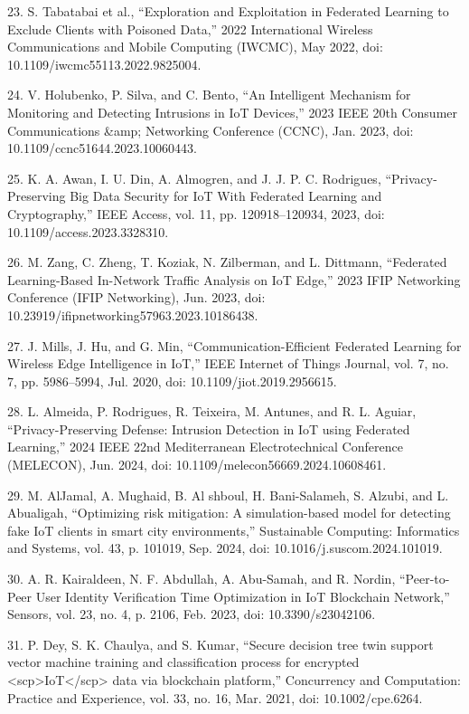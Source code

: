 23. S. Tabatabai et al., ``Exploration and Exploitation in Federated
Learning to Exclude Clients with Poisoned Data,'' 2022 International
Wireless Communications and Mobile Computing (IWCMC), May 2022, doi:
10.1109/iwcmc55113.2022.9825004.

24. V. Holubenko, P. Silva, and C. Bento, ``An Intelligent Mechanism for
Monitoring and Detecting Intrusions in IoT Devices,'' 2023 IEEE 20th
Consumer Communications \&amp; Networking Conference (CCNC), Jan. 2023,
doi: 10.1109/ccnc51644.2023.10060443.

25. K. A. Awan, I. U. Din, A. Almogren, and J. J. P. C. Rodrigues,
``Privacy-Preserving Big Data Security for IoT With Federated Learning
and Cryptography,'' IEEE Access, vol. 11, pp. 120918--120934, 2023, doi:
10.1109/access.2023.3328310.

26. M. Zang, C. Zheng, T. Koziak, N. Zilberman, and L. Dittmann,
``Federated Learning-Based In-Network Traffic Analysis on IoT Edge,''
2023 IFIP Networking Conference (IFIP Networking), Jun. 2023, doi:
10.23919/ifipnetworking57963.2023.10186438.

27. J. Mills, J. Hu, and G. Min, ``Communication-Efficient Federated
Learning for Wireless Edge Intelligence in IoT,'' IEEE Internet of
Things Journal, vol. 7, no. 7, pp. 5986--5994, Jul. 2020, doi:
10.1109/jiot.2019.2956615.

28. L. Almeida, P. Rodrigues, R. Teixeira, M. Antunes, and R. L. Aguiar,
``Privacy-Preserving Defense: Intrusion Detection in IoT using Federated
Learning,'' 2024 IEEE 22nd Mediterranean Electrotechnical Conference
(MELECON), Jun. 2024, doi: 10.1109/melecon56669.2024.10608461.

29. M. AlJamal, A. Mughaid, B. Al shboul, H. Bani-Salameh, S. Alzubi,
and L. Abualigah, ``Optimizing risk mitigation: A simulation-based model
for detecting fake IoT clients in smart city environments,'' Sustainable
Computing: Informatics and Systems, vol. 43, p. 101019, Sep. 2024, doi:
10.1016/j.suscom.2024.101019.

30. A. R. Kairaldeen, N. F. Abdullah, A. Abu-Samah, and R. Nordin,
``Peer-to-Peer User Identity Verification Time Optimization in IoT
Blockchain Network,'' Sensors, vol. 23, no. 4, p. 2106, Feb. 2023, doi:
10.3390/s23042106.

31. P. Dey, S. K. Chaulya, and S. Kumar, ``Secure decision tree twin
support vector machine training and classification process for encrypted
\textless scp\textgreater IoT\textless/scp\textgreater{} data via
blockchain platform,'' Concurrency and Computation: Practice and
Experience, vol. 33, no. 16, Mar. 2021, doi: 10.1002/cpe.6264.

